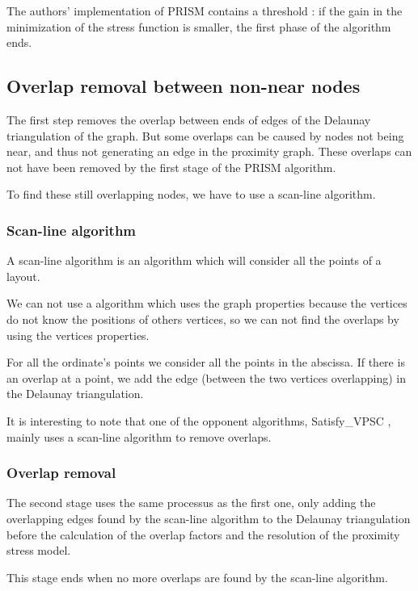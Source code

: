\documentclass[12pt]{report}
\begin{document}
The authors' implementation of PRISM contains a threshold : if the gain in the minimization of the stress function is smaller, the first phase of the algorithm ends.


\subsection{Overlap removal between non-near nodes}

The first step removes the overlap between ends of edges of the Delaunay triangulation of the graph. But some overlaps can be caused by nodes not being near, and thus not generating an edge in the proximity graph. These overlaps can not have been removed by the first stage of the PRISM algorithm.

To find these still overlapping nodes, we have to use a scan-line algorithm.

\subsubsection{Scan-line algorithm}

A scan-line algorithm is an algorithm which will consider all the points of a layout.

We can not use a algorithm which uses the graph properties because the vertices do not know the positions of others vertices, so we can not find the overlaps by using the vertices properties.

For all the ordinate's points we consider all the points in the abscissa. If there is an overlap at a point, we add the edge (between the two vertices overlapping) in the Delaunay triangulation. 


\bigskip
It is interesting to note that one of the opponent algorithms, Satisfy\_VPSC \cite{VPSC06}, mainly uses a scan-line algorithm to remove overlaps.

\subsubsection{Overlap removal}

The second stage uses the same processus as the first one, only adding the overlapping edges found by the scan-line algorithm to the Delaunay triangulation before the calculation of the overlap factors and the resolution of the proximity stress model.

This stage ends when no more overlaps are found by the scan-line algorithm.
\end{document}

